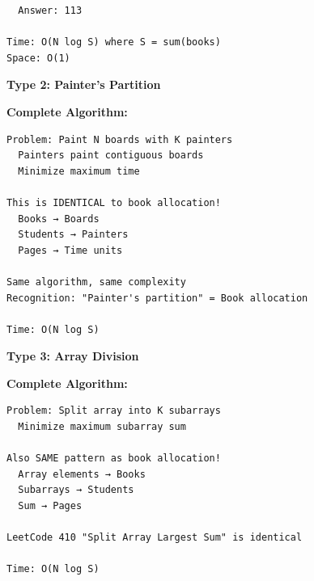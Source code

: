 \documentclass[11pt,a4paper,oneside]{book}
\begin{document}
\begin{tcolorbox}[
    enhanced,breakable,
    colback=successgreen!10,
    colframe=successgreen,
    boxrule=1.5pt,
    arc=3mm,
    title=\textbf{Complete Contiguous Allocation Algorithms}
]
\begin{verbatim}
  Answer: 113

Time: O(N log S) where S = sum(books)
Space: O(1)
\end{verbatim}

\textbf{Type 2: Painter's Partition}

\textbf{Complete Algorithm:}
\begin{verbatim}
Problem: Paint N boards with K painters
  Painters paint contiguous boards
  Minimize maximum time

This is IDENTICAL to book allocation!
  Books → Boards
  Students → Painters
  Pages → Time units

Same algorithm, same complexity
Recognition: "Painter's partition" = Book allocation

Time: O(N log S)
\end{verbatim}

\textbf{Type 3: Array Division}

\textbf{Complete Algorithm:}
\begin{verbatim}
Problem: Split array into K subarrays
  Minimize maximum subarray sum

Also SAME pattern as book allocation!
  Array elements → Books
  Subarrays → Students
  Sum → Pages

LeetCode 410 "Split Array Largest Sum" is identical

Time: O(N log S)
\end{verbatim}
\end{tcolorbox}
\end{document}
